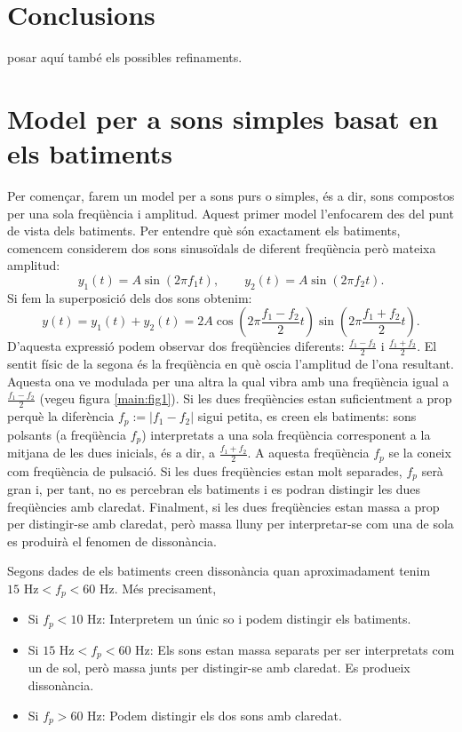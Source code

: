 \documentclass{article}
\theoremstyle{math}
\newcommand{\0}{\ensuremath{\vb{0}}}
\begin{document}
\section{Conclusions}
posar aquí també els possibles refinaments.
\printbibliography[heading=bibintoc]
\appendix
\section{Model per a sons simples basat en els batiments}\label{model_batiments}
Per començar, farem un model per a sons purs o simples, és a dir, sons compostos per una sola freqüència i amplitud. Aquest primer model l'enfocarem des del punt de vista dels batiments. Per entendre què són exactament els batiments, comencem considerem dos sons sinusoïdals de diferent freqüència però mateixa amplitud: $$y_1(t)=A\sin(2\pi f_1 t),\qquad y_2(t)=A\sin(2\pi f_2 t).$$
Si fem la superposició dels dos sons obtenim: $$y(t)=y_1(t)+y_2(t)=2A\cos\left(2\pi\frac{f_1-f_2}{2}t\right)\sin\left(2\pi\frac{f_1+f_2}{2}t\right).$$
D'aquesta expressió podem observar dos freqüències diferents: $\frac{f_1-f_2}{2}$ i $\frac{f_1+f_2}{2}$. El sentit físic de la segona és la freqüència en què osci\lgem a l'amplitud de l'ona resultant. Aquesta ona ve modulada per una altra la qual vibra amb una freqüència igual a $\frac{f_1-f_2}{2}$ (vegeu figura \ref{main:fig1}). Si les dues freqüències estan suficientment a prop perquè la diferència $f_p:=|f_1-f_2|$ sigui petita, es creen els batiments: sons polsants (a freqüència $f_p$) interpretats a una sola freqüència corresponent a la mitjana de les dues inicials, és a dir, a $\frac{f_1+f_2}{2}$. A aquesta freqüència $f_p$ se la coneix com freqüència de pulsació. Si les dues freqüències estan molt separades, $f_p$ serà gran i, per tant, no es percebran els batiments i es podran distingir les dues freqüències amb claredat. Finalment, si les dues freqüències estan massa a prop per distingir-se amb claredat, però massa lluny per interpretar-se com una de sola es produirà el fenomen de dissonància.
\begin{center}
    
    \label{main:fig1}
\end{center}
Segons dades de \cite{gibson} els batiments creen dissonància quan aproximadament tenim $15\text{ Hz}<f_p<60\text{ Hz}$. Més precisament,
\begin{itemize}
    \item Si $f_p<10\text{ Hz}$: Interpretem un únic so i podem distingir els batiments.
    \item Si $15\text{ Hz}<f_p<60\text{ Hz}$: Els sons estan massa separats per ser interpretats com un de sol, però massa junts per distingir-se amb claredat. Es produeix dissonància.
    \item Si $f_p>60\text{ Hz}$: Podem distingir els dos sons amb claredat.
\end{itemize}
\end{document}
